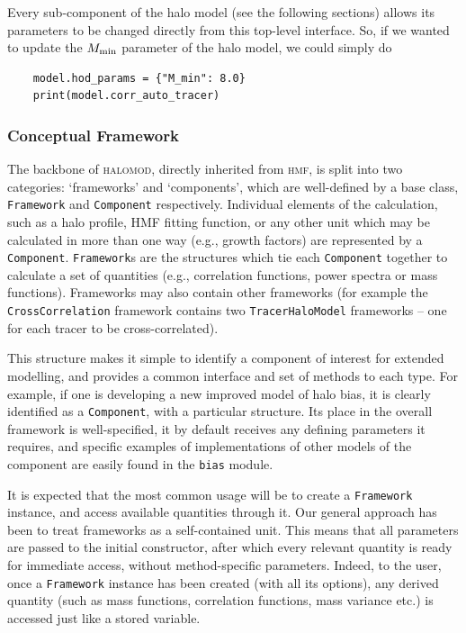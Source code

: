 \documentclass[5p]{elsarticle}
\begin{document}
Every sub-component of the halo model (see the following sections) allows its parameters to be changed directly from this top-level interface. So, if we wanted to update the $M_{\rm min}$ parameter of the halo model, we could simply do
\begin{lstlisting}
    model.hod_params = {"M_min": 8.0}
    print(model.corr_auto_tracer)
\end{lstlisting}

\subsubsection{Conceptual Framework}
\label{sec:halomod:overview:concept}
The backbone of \textsc{halomod}, directly inherited from \textsc{hmf}, is split into two categories: `frameworks' and `components', which are well-defined by a base class, \verb|Framework| and \verb|Component| respectively. Individual elements of the calculation, such as a halo profile, HMF fitting function, or any other unit which may be calculated in more than one way (e.g., growth factors) are represented by a \verb|Component|. \verb|Framework|s are the structures which tie each \verb|Component| together to calculate a set of quantities (e.g., correlation functions, power spectra or mass functions). Frameworks may also contain other frameworks (for example the \verb|CrossCorrelation| framework contains two \verb|TracerHaloModel| frameworks -- one for each tracer to be cross-correlated).

This structure makes it simple to identify a component of interest for extended modelling, and provides a common interface and set of methods to each type. For example, if one is developing a new improved model of halo bias, it is clearly identified as a \verb|Component|, with a particular structure. Its place in the overall framework is well-specified, it by default receives any defining parameters it requires, and specific examples of implementations of other models of the component are easily found in the \verb|bias| module. 

It is expected that the most common usage will be to create a \verb|Framework| instance, and access available quantities through it. Our general approach has been to treat frameworks as a self-contained unit. This means that all parameters are passed to the initial constructor, after which every relevant quantity is ready for immediate access, without method-specific parameters. Indeed, to the user, once a \verb|Framework| instance has been created (with all its options), any derived quantity (such as mass functions, correlation functions, mass variance etc.) is accessed just like a stored variable. 
\end{document}
